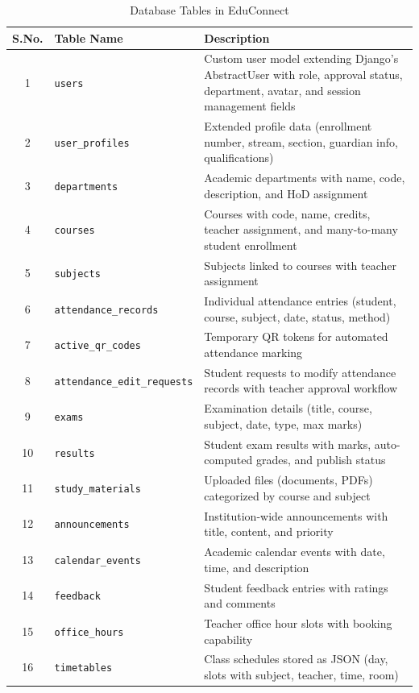 \begin{table}[H]
\centering
\caption{Database Tables in EduConnect}
\label{tab:db_tables}
\footnotesize
\begin{tabular}{|c|p{3.5cm}|p{7.5cm}|}
\hline
\textbf{S.No.} & \textbf{Table Name} & \textbf{Description} \\
\hline
1 & \texttt{users} & Custom user model extending Django's AbstractUser with role, approval status, department, avatar, and session management fields \\
\hline
2 & \texttt{user\_profiles} & Extended profile data (enrollment number, stream, section, guardian info, qualifications) \\
\hline
3 & \texttt{departments} & Academic departments with name, code, description, and HoD assignment \\
\hline
4 & \texttt{courses} & Courses with code, name, credits, teacher assignment, and many-to-many student enrollment \\
\hline
5 & \texttt{subjects} & Subjects linked to courses with teacher assignment \\
\hline
6 & \texttt{attendance\_records} & Individual attendance entries (student, course, subject, date, status, method) \\
\hline
7 & \texttt{active\_qr\_codes} & Temporary QR tokens for automated attendance marking \\
\hline
8 & \texttt{attendance\_edit\_requests} & Student requests to modify attendance records with teacher approval workflow \\
\hline
9 & \texttt{exams} & Examination details (title, course, subject, date, type, max marks) \\
\hline
10 & \texttt{results} & Student exam results with marks, auto-computed grades, and publish status \\
\hline
11 & \texttt{study\_materials} & Uploaded files (documents, PDFs) categorized by course and subject \\
\hline
12 & \texttt{announcements} & Institution-wide announcements with title, content, and priority \\
\hline
13 & \texttt{calendar\_events} & Academic calendar events with date, time, and description \\
\hline
14 & \texttt{feedback} & Student feedback entries with ratings and comments \\
\hline
15 & \texttt{office\_hours} & Teacher office hour slots with booking capability \\
\hline
16 & \texttt{timetables} & Class schedules stored as JSON (day, slots with subject, teacher, time, room) \\

\end{tabular}
\end{table}

